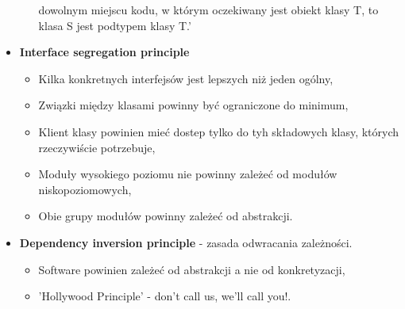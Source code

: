 \documentclass[a4paper]{article}
\begin{document}
\begin{itemize}
\begin{itemize}
            dowolnym miejscu kodu, w którym oczekiwany jest obiekt klasy T, to klasa S jest podtypem klasy T.'
        \end{itemize}
        \item \textbf{Interface segregation principle}
        \begin{itemize}
            \item Kilka konkretnych interfejsów jest lepszych niż jeden ogólny,
            \item Związki między klasami powinny być ograniczone do minimum,
            \item Klient klasy powinien mieć dostep tylko do tyh składowych klasy, których rzeczywiście potrzebuje,
            \item Moduły wysokiego poziomu nie powinny zależeć od modułów niskopoziomowych,
            \item Obie grupy modułów powinny zależeć od abstrakcji.
        \end{itemize}
        \item \textbf{Dependency inversion principle} - zasada odwracania zależności.
        \begin{itemize}
            \item Software powinien zależeć od abstrakcji a nie od konkretyzacji,
            \item 'Hollywood Principle' - don't call us, we'll call you!.
        \end{itemize}
    \end{itemize}
\end{document}
